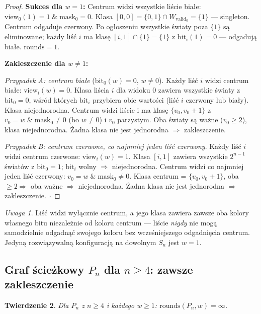 \documentclass[12pt,a4paper]{article}
\theoremstyle{plain}
\newtheorem{theorem}{Twierdzenie}[section]
\theoremstyle{definition}
\theoremstyle{remark}
\newtheorem{remark}[theorem]{Uwaga}
\newcommand{\rounds}{\mathrm{rounds}}
\newcommand{\view}{\mathrm{view}}
\newcommand{\mask}{\mathrm{mask}}
\newcommand{\Wval}{W_{\mathrm{valid}}}
\begin{document}
\begin{proof}
\textbf{Sukces dla $w = 1$:} Centrum widzi wszystkie liście białe: $\view_0(1) = 1 \;\&\; \mask_0 = 0$. Klasa $[0,0] = \{0,1\} \cap \Wval_0 = \{1\}$ — singleton. Centrum odgaduje czerwony. Po ogłoszeniu wszystkie światy poza $\{1\}$ są eliminowane; każdy liść $i$ ma klasę $[i,1] \cap \{1\} = \{1\}$ z $\mathrm{bit}_i(1) = 0$ — odgadują białe. $\rounds = 1$.

\textbf{Zakleszczenie dla $w \ne 1$:}

\emph{Przypadek A: centrum białe} ($\mathrm{bit}_0(w) = 0$, $w \ne 0$). Każdy liść $i$ widzi centrum białe: $\view_i(w) = 0$. Klasa liścia $i$ dla widoku 0 zawiera wszystkie światy z $\mathrm{bit}_0 = 0$, wśród których $\mathrm{bit}_i$ przybiera obie wartości (liść $i$ czerwony lub biały). Klasa niejednorodna. Centrum widzi liście i ma klasę $\{v_0, v_0 + 1\}$ z $v_0 = w\;\&\;\mask_0 \ne 0$ (bo $w \ne 0$) i $v_0$ parzystym. Oba światy są ważne ($v_0 \ge 2$), klasa niejednorodna. Żadna klasa nie jest jednorodna $\Rightarrow$ zakleszczenie.

\emph{Przypadek B: centrum czerwone, co najmniej jeden liść czerwony}. Każdy liść $i$ widzi centrum czerwone: $\view_i(w) = 1$. Klasa $[i,1]$ zawiera wszystkie $2^{n-1}$ światów z $\mathrm{bit}_0 = 1$; $\mathrm{bit}_i$ wolny $\Rightarrow$ niejednorodna. Centrum widzi co najmniej jeden liść czerwony: $v_0 = w\;\&\;\mask_0 \ne 0$. Klasa centrum = $\{v_0, v_0+1\}$, oba $\ge 2 \Rightarrow$ oba ważne $\Rightarrow$ niejednorodna. Żadna klasa nie jest jednorodna $\Rightarrow$ zakleszczenie. $\square$
\end{proof}

\begin{remark}
Liść widzi wyłącznie centrum, a jego klasa zawiera zawsze oba kolory własnego bitu niezależnie od koloru centrum — liście \emph{nigdy} nie mogą samodzielnie odgadnąć swojego koloru bez wcześniejszego odgadnięcia centrum. Jedyną rozwiązywalną konfiguracją na dowolnym $S_n$ jest $w = 1$.
\end{remark}

\subsection{Graf ścieżkowy $P_n$ dla $n \ge 4$: zawsze zakleszczenie}

\begin{theorem}
\label{thm:path}
Dla $P_n$ z $n \ge 4$ i każdego $w \ge 1$: $\rounds(P_n,w) = \infty$.
\end{theorem}
\end{document}
